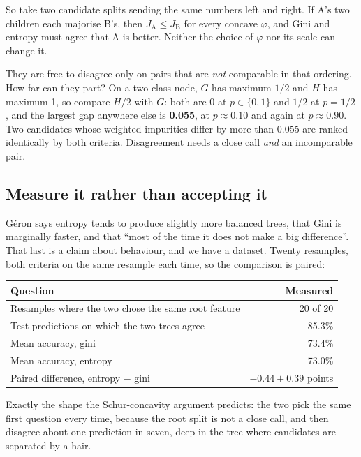 \documentclass[11pt,a4paper]{article}
\begin{document}
So take two candidate splits sending the same numbers left and right. If A's
two children each majorise B's, then $J_{\text{A}} \le J_{\text{B}}$ for every
concave $\varphi$, and Gini and entropy must agree that A is better. Neither
the choice of $\varphi$ nor its scale can change it.

They are free to disagree only on pairs that are \emph{not} comparable in that
ordering. How far can they part? On a two-class node, $G$ has maximum $1/2$ and
$H$ has maximum 1, so compare $H/2$ with $G$: both are 0 at $p \in \{0,1\}$ and
$1/2$ at $p = 1/2$, and the largest gap anywhere else is \textbf{0.055}, at
$p \approx 0.10$ and again at $p \approx 0.90$. Two candidates whose weighted
impurities differ by more than 0.055 are ranked identically by both criteria.
Disagreement needs a close call \emph{and} an incomparable pair.

\subsection{Measure it rather than accepting it}

Géron says entropy tends to produce slightly more balanced trees, that Gini is
marginally faster, and that ``most of the time it does not make a big
difference''. That last is a claim about behaviour, and we have a dataset.
Twenty resamples, both criteria on the same resample each time, so the
comparison is paired:

\begin{center}
\small
\begin{tabular}{lr}
\toprule
\textbf{Question} & \textbf{Measured} \\
\midrule
Resamples where the two chose the same root feature & 20 of 20 \\
Test predictions on which the two trees agree & 85.3\% \\
Mean accuracy, gini & 73.4\% \\
Mean accuracy, entropy & 73.0\% \\
Paired difference, entropy $-$ gini & $-0.44 \pm 0.39$ points \\
\bottomrule
\end{tabular}
\end{center}

Exactly the shape the Schur-concavity argument predicts: the two pick the same
first question every time, because the root split is not a close call, and then
disagree about one prediction in seven, deep in the tree where candidates are
separated by a hair.
\end{document}
